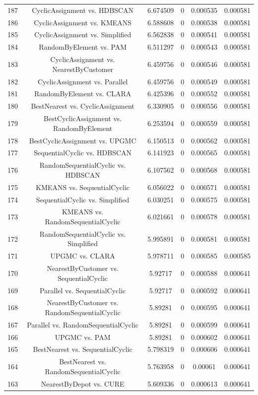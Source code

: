 \documentclass[a4paper,10pt]{article}
\begin{document}
\begin{landscape}
\begin{table}[!htp]
\begin{tabular}{cccccc}
187&CyclicAssignment vs. HDBSCAN&6.674509&0&0.000535&0.000581\\
186&CyclicAssignment vs. KMEANS&6.588608&0&0.000538&0.000581\\
185&CyclicAssignment vs. Simplified&6.562838&0&0.000541&0.000581\\
184&RandomByElement vs. PAM&6.511297&0&0.000543&0.000581\\
183&CyclicAssignment vs. NearestByCustomer&6.459756&0&0.000546&0.000581\\
182&CyclicAssignment vs. Parallel&6.459756&0&0.000549&0.000581\\
181&RandomByElement vs. CLARA&6.425396&0&0.000552&0.000581\\
180&BestNearest vs. CyclicAssignment&6.330905&0&0.000556&0.000581\\
179&BestCyclicAssignment vs. RandomByElement&6.253594&0&0.000559&0.000581\\
178&BestCyclicAssignment vs. UPGMC&6.150513&0&0.000562&0.000581\\
177&SequentialCyclic vs. HDBSCAN&6.141923&0&0.000565&0.000581\\
176&RandomSequentialCyclic vs. HDBSCAN&6.107562&0&0.000568&0.000581\\
175&KMEANS vs. SequentialCyclic&6.056022&0&0.000571&0.000581\\
174&SequentialCyclic vs. Simplified&6.030251&0&0.000575&0.000581\\
173&KMEANS vs. RandomSequentialCyclic&6.021661&0&0.000578&0.000581\\
172&RandomSequentialCyclic vs. Simplified&5.995891&0&0.000581&0.000581\\
171&UPGMC vs. CLARA&5.978711&0&0.000585&0.000585\\
170&NearestByCustomer vs. SequentialCyclic&5.92717&0&0.000588&0.000641\\
169&Parallel vs. SequentialCyclic&5.92717&0&0.000592&0.000641\\
168&NearestByCustomer vs. RandomSequentialCyclic&5.89281&0&0.000595&0.000641\\
167&Parallel vs. RandomSequentialCyclic&5.89281&0&0.000599&0.000641\\
166&UPGMC vs. PAM&5.89281&0&0.000602&0.000641\\
165&BestNearest vs. SequentialCyclic&5.798319&0&0.000606&0.000641\\
164&BestNearest vs. RandomSequentialCyclic&5.763958&0&0.00061&0.000641\\
163&NearestByDepot vs. CURE&5.609336&0&0.000613&0.000641\\

\end{tabular}
\end{table}
\end{landscape}
\end{document}
